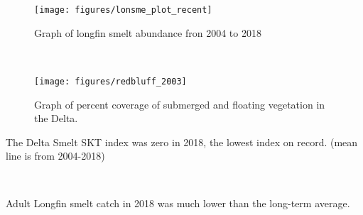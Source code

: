 \documentclass[
]{book}
\begin{document}
\begin{panel-grid}
\begin{columns-nocenter}
\begin{column800}
\begin{expand}

\begin{figure}
\texttt{[image: figures/lonsme\_plot\_recent]} \caption{Graph of longfin smelt abundance fron 2004 to 2018}\label{fig:unnamed-chunk-183}
\end{figure}

\end{expand}

\end{column800}

\begin{column40}

~

\end{column40}

\begin{column800}

\begin{expand}

\begin{figure}
\texttt{[image: figures/redbluff\_2003]} \caption{Graph of percent coverage of submerged and floating vegetation in the Delta.}\label{fig:unnamed-chunk-184}
\end{figure}

\end{expand}

\end{column800}

\end{columns-nocenter}

\begin{columns-nocenter}

\begin{column800}

The Delta Smelt SKT index was zero in 2018, the lowest index on record. (mean line is from 2004-2018)

\end{column800}

\begin{column40}

~

\end{column40}

\begin{column800}

Adult Longfin smelt catch in 2018 was much lower than the long-term average.

\end{column800}


\end{columns-nocenter}
\end{panel-grid}
\end{document}
